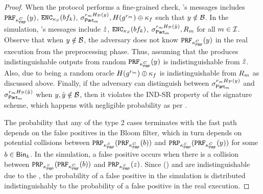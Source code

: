 \begin{proof}
When the protocol performs a fine-grained check, \server's messages includes $ \prf{\prfKeyClient}(\genericCInputElmt)$, $\encrypt[\bloomFilterKey](\bloomFilter[\bloomFilterIdx])$, $\genericSig[\partition{\partitionIdx}]^{\genericRand_\partitionIdx \primeRO(\genericCInputElmt)}, \ro(\qrGen^{\genericRand_\partitionIdx}) \oplus \fileKey$ such that $\genericCInputElmt \notin \blocklist$. In the
simulation, \server's messages include $\hat{z}$, $\encrypt[\bloomFilterKey](\bloomFilter[\bloomFilterIdx])$, $\genericSig[\partition{\partitionIdx}]^{\genericRand_\partitionIdx \primeRO(\hat{\genericCInputElmt})}, R_\partitionIdx$ for all $m \in \mathcal{I}$. Observe that when $\genericCInputElmt \notin \blocklist$, the adversary does not know $\prf{\prfKeyClient}(\genericCInputElmt)$ in the real execution from the preprocessing phase. Thus, assuming that the \prf produces indistinguishable outputs from random $\prf{\prfKeyClient}(\genericCInputElmt)$ is indistinguishable from $\hat{z}$. Also, due to \ro being a random oracle $\ro(\qrGen^{\genericRand_\partitionIdx}) \oplus \fileKey$ is indistinguishable from $R_m$ as discussed above. Finally, if the adversary can distinguish between $\genericSig[\partition{\partitionIdx}]^{\genericRand_\partitionIdx \primeRO(\genericCInputElmt)}$ and $\genericSig[\partition{\partitionIdx}]^{\genericRand_\partitionIdx \primeRO(\hat{\genericCInputElmt})}$ when $\genericCInputElmt, \hat{\genericCInputElmt} \notin \blocklist$, then it violates the IND-SR property of the signature scheme, which happens with negligible probability as per . 

The probability that any of the type 2 cases terminates with the fast path depends on the false positives in the Bloom filter, which in turn depends on potential collisions between $\prp{\prpKeyServer}(\prf{\prfKeyClient}(\genericBlocklistElmt))$ and $\prp{\prpKeyServer}(\prf{\prfKeyClient}(\genericCInputElmt))$ for some $\genericBlocklistElmt \in \binn{\binIdx}$. In the simulation, a false positive occurs when there is a collision between  $\prp{\prpKeyServer}(\prf{\prfKeyClient}(\genericBlocklistElmt))$ and $\prp{\prpKeyServer}(\genericCInputElmtPRFEval)$. Since \prf{\prfKeyClient}(\genericBlocklistElmt) and \genericCInputElmtPRFEval are indistinguishable due to the \prf, the probability of a false positive in the simulation is distributed indistinguishably to the probability of a false positive in the real execution. 
\end{proof}
